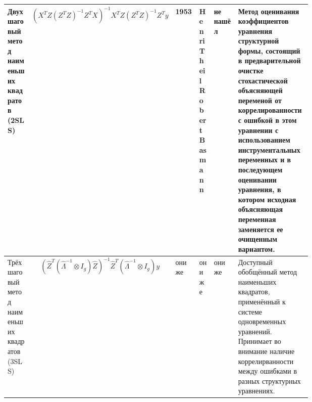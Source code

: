 \documentclass[10pt,a4paper]{article}
\begin{document}
\begin{table}
\begin{tabularx}{\textwidth}{|p{0.1\linewidth}|X|p{0.1\linewidth}|p{0.055\linewidth}|p{0.1\linewidth}|p{0.35\linewidth}|}
\hline
Двухшаговый метод наименьших квадратов (2SLS) & \[(X^T Z (Z^T Z)^{-1} Z^T X)^{-1} X^T Z(Z^T Z)^{-1} Z^Ty \] & 1953 \newline   1957 & Henri Theil \newline Robert Basmann & не нашёл  &  Метод оценивания коэффициентов уравнения структурной формы, состоящий в предварительной очистке стохастической объясняющей переменой от коррелированности с ошибкой в этом уравнении с использованием инструментальных переменных и в последующем оценивании уравнения, в котором исходная объясняющая переменная заменяется ее очищенным вариантом. \tabularnewline
\hline
Трёхшаговый метод наименьших квадратов (3SLS) & \[ (\hat Z^T(\hat \Lambda^{-1} \otimes I_g) \hat Z)^{-1} \hat Z^T (\hat \Lambda^{-1} \otimes I_g)y \] & они же & они же & они же & Доступный обобщённый метод наименьших квадратов, применённый к системе одновременных уравнений. Принимает во внимание наличие коррелирванности между ошибками в разных структурных уравнениях. \\
\hline
\end{tabularx}
\end{table}
\end{document}
